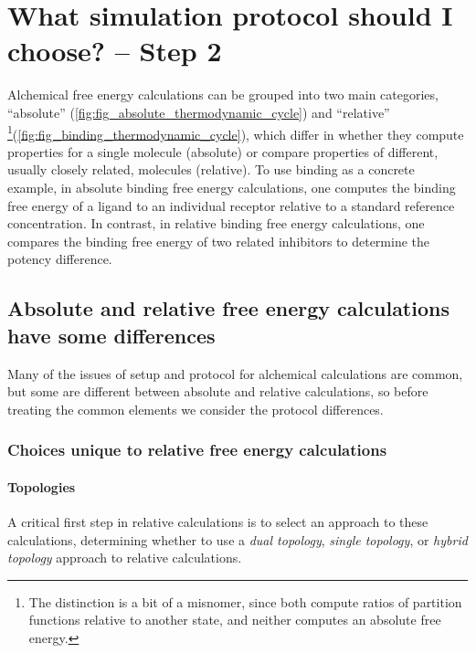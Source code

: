 \documentclass[9pt,bestpractices]{livecoms}
\begin{document}
%
%
%
%
\section{What simulation protocol should I choose? -- Step 2}
\label{sec:step2}
Alchemical free energy calculations can be grouped into two main categories, ``absolute'' (\ref{fig:fig_absolute_thermodynamic_cycle}) and ``relative'' \footnote{The distinction is a bit of a misnomer, since both compute ratios of partition functions relative to another state, and neither computes an absolute free energy.}(\ref{fig:fig_binding_thermodynamic_cycle}), which differ in whether they compute properties for a single molecule (absolute) or compare properties of different, usually closely related, molecules (relative).
To use binding as a concrete example, in absolute binding free energy calculations, one computes the binding free energy of a ligand to an individual receptor relative to a standard reference concentration.
In contrast, in relative binding free energy calculations, one compares the binding free energy of two related inhibitors to determine the potency difference.
\subsection{Absolute and relative free energy calculations have some differences}
Many of the issues of setup and protocol for alchemical calculations are common, but some are different between absolute and relative calculations, so before treating the common elements we consider the protocol differences.

\subsubsection{Choices unique to relative free energy calculations}

\paragraph{Topologies} A critical first step in relative calculations is to select an approach to these calculations, determining whether to use a \emph{dual topology}, \emph{single topology}, or \emph{hybrid topology} approach to relative calculations.
\end{document}
